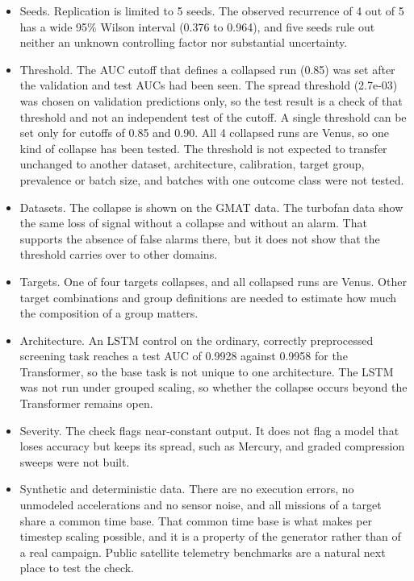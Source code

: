 \begin{itemize}
\item Seeds. Replication is limited to 5 seeds. The observed recurrence of 4 out of 5 has a wide 95\% Wilson interval (0.376 to 0.964), and five seeds rule out neither an unknown controlling factor nor substantial uncertainty.
\item Threshold. The AUC cutoff that defines a collapsed run (0.85) was set after the validation and test AUCs had been seen. The spread threshold (2.7e-03) was chosen on validation predictions only, so the test result is a check of that threshold and not an independent test of the cutoff. A single threshold can be set only for cutoffs of 0.85 and 0.90. All 4 collapsed runs are Venus, so one kind of collapse has been tested. The threshold is not expected to transfer unchanged to another dataset, architecture, calibration, target group, prevalence or batch size, and batches with one outcome class were not tested.
\item Datasets. The collapse is shown on the GMAT data. The turbofan data show the same loss of signal without a collapse and without an alarm. That supports the absence of false alarms there, but it does not show that the threshold carries over to other domains.
\item Targets. One of four targets collapses, and all collapsed runs are Venus. Other target combinations and group definitions are needed to estimate how much the composition of a group matters.
\item Architecture. An LSTM control on the ordinary, correctly preprocessed screening task reaches a test AUC of 0.9928 against 0.9958 for the Transformer, so the base task is not unique to one architecture. The LSTM was not run under grouped scaling, so whether the collapse occurs beyond the Transformer remains open.
\item Severity. The check flags near-constant output. It does not flag a model that loses accuracy but keeps its spread, such as Mercury, and graded compression sweeps were not built.
\item Synthetic and deterministic data. There are no execution errors, no unmodeled accelerations and no sensor noise, and all missions of a target share a common time base. That common time base is what makes per timestep scaling possible, and it is a property of the generator rather than of a real campaign. Public satellite telemetry benchmarks \cite{kotowski2024,ruszczak2025,hundman2018} are a natural next place to test the check.
\end{itemize}

